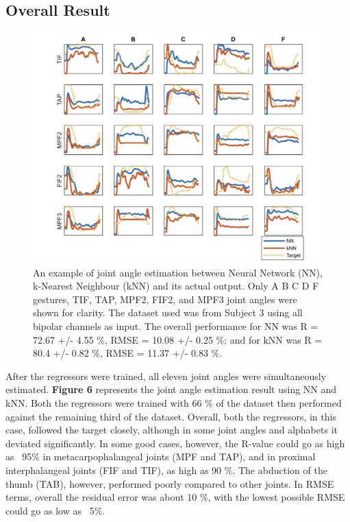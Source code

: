 \documentclass[conference]{IEEEtran}
\begin{document}
\subsection{Overall Result}
\begin{figure}
    \centering
    \includegraphics[width=\columnwidth]{figure6.png}
    \caption{An example of joint angle estimation between Neural Network (NN), k-Nearest Neighbour 
(kNN) and its actual output. Only A B C D F gestures, TIF, TAP, MPF2, FIF2, and MPF3 joint angles 
were shown for clarity. The dataset used was from Subject 3 
using all bipolar channels as input. The overall performance for NN was R = 72.67 +/- 4.55 \%, RMSE 
= 10.08 +/- 0.25 \%; and for kNN was R = 80.4 +/- 0.82 \%, RMSE = 11.37 +/- 0.83 \%.}
    \label{figure6}
\end{figure}

After the regressors were trained, all eleven joint angles were simultaneously estimated. \textbf{Figure 6}
represents the joint angle estimation result using NN and kNN. Both the regressors were trained with 66 \% 
of the dataset then performed against the remaining third of the dataset. Overall, both the regressors, in this 
case, followed the target closely, although in some joint angles and alphabets it deviated significantly. In some good cases, however, the R-value could go as high as ~95\% in 
metacarpophalangeal joints (MPF and TAP), and in proximal interphalangeal joints (FIF and TIF), as high 
as 90 \%. The abduction of the thumb (TAB), however, performed poorly compared to other joints. In RMSE 
terms, overall the residual error was about 10 \%, with the lowest possible RMSE could go as low as ~5\%.
\end{document}
